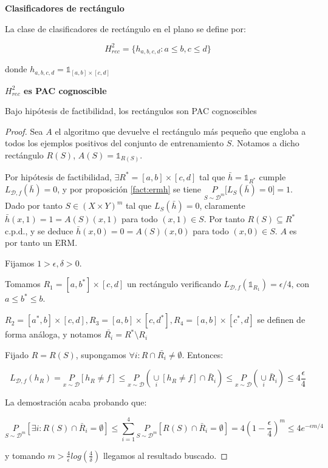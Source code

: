 \begin{example}
  \begin{definition*} \textbf{Clasificadores de rectángulo}

  La clase de clasificadores de rectángulo en el plano se define por:

  \[H^2_{rec} = \{ h_{a,b,c,d}: a\le b, c\le d\}\]

  donde $h_{a,b,c,d} = \mathds{1}_{[a,b]\times [c,d]}$
  \end{definition*}


  \begin{fact} \textbf{$H_{rec}^2$ es PAC cognoscible}

  Bajo hipótesis de factibilidad, los rectángulos son PAC cognoscibles
  \end{fact}

    \begin{proof}
    Sea $A$ el algoritmo que devuelve el rectángulo más pequeño que engloba a todos los ejemplos positivos del conjunto 
    de entrenamiento $S$. Notamos a dicho rectángulo $R(S)$, $A(S) = \mathds{1}_{R(S)}$.

    Por hipótesis de factibilidad, $\exists R^{\ast} = [a,b]\times [c,d]$ tal que $\bar{h} = \mathds{1}_{R^{\ast}}$ cumple 
    $L_{\mathcal{D},f}(\bar{h}) = 0$, y por proposición \ref{fact:ermh} se tiene 
    $\underset{S\sim \mathcal{D}^m}{P} \bigg[L_S(\bar{h}) = 0 \bigg] = 1$. 
    Dado por tanto $S \in (X\times Y)^m$ tal que $L_S(\bar{h}) = 0$, claramente $\bar{h}(x,1)= 1 = A(S)(x,1)$ para 
    todo $(x,1)\in S$. Por tanto $R(S) \subseteq R^{\ast}$ c.p.d., y se deduce $\bar{h}(x,0)= 0 = A(S)(x,0)$ para 
    todo $(x,0)\in S$. $A$ es por tanto un ERM.

    Fijamos $1 > \epsilon, \delta > 0$.

    Tomamos $R_1 = [a,b^{\ast}] \times [c,d]$ un rectángulo verificando $L_{\mathcal{D},f}(\mathds{1}_{R_1}) = \epsilon/4$, 
    con $a\le b^{\ast} \le b$.

    $R_2= [a^{\ast},b] \times [c,d], R_3=[a,b] \times [c,d^{\ast}], R_4=[a,b] \times [c^{\ast},d]$ se definen 
    de forma análoga, y notamos $\bar{R_i} = R^{\ast} \setminus R_i$

    Fijado $R=R(S)$, supongamos $\forall i : R \cap \bar{R_i} \neq \emptyset$. Entonces:

    \[L_{\mathcal{D},f}(h_R) = \underset{x\sim \mathcal{D}}{P} [h_R \neq f] \le \underset{x\sim \mathcal{D}}{P} 
    \left(\underset{i}{\cup} [h_R \neq f] \cap \bar{R}_i\right) \le \underset{x\sim \mathcal{D}}{P} \left(\underset{i}{\cup} 
    \bar{R}_i\right) \le 4\frac{\epsilon}{4}\]

    La demostración acaba probando que:

    \[\underset{S\sim \mathcal{D}^m}{P} [\exists i : R(S)\cap \bar{R}_i = \emptyset] \le \sum_{i=1}^4 
    \underset{S\sim \mathcal{D}^m}{P}[R(S)\cap \bar{R}_i = \emptyset] = 4(1-\frac{\epsilon}{4})^m \le 4e^{-\epsilon m/4}\]

    y tomando $m > \frac{4}{\epsilon} log \left( \frac{4}{\delta} \right)$ llegamos al resultado buscado.
    \end{proof}
\end{example}

